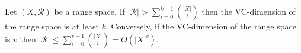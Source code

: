\begin{lemma}
Let \((X, \mathcal{R})\) be a range space.
If \(| \mathcal{R} | > \sum_{i=0}^{k-1} {| X | \choose i} \)
then the VC-dimension of the range space is at least \(k\).
Conversely, if the VC-dimension of the range space is \(v\) then
\(| \mathcal{R} | \leq \sum_{i=0}^{v-1} {| X | \choose i} = O({| X |}^v)\).
\end{lemma}
